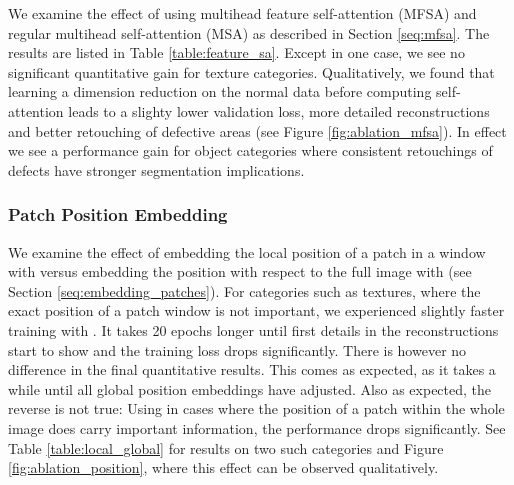 \documentclass[final,5p,times,twocolumn]{elsarticle}
\begin{document}
	We examine the effect of using multihead feature self-attention (MFSA) and regular multihead self-attention (MSA) as described in Section \ref{seq:mfsa}. The results are listed in Table \ref{table:feature_sa}. Except in one case, we see no significant quantitative gain for texture categories. Qualitatively, we found that learning a dimension reduction on the normal data before computing self-attention leads to a slighty lower validation loss, more detailed reconstructions and better retouching of defective areas (see Figure \ref{fig:ablation_mfsa}). In effect we see a performance gain for object categories where consistent retouchings of defects have stronger segmentation implications. 
	
	\begin{table}[h]
		\begin{center}
			\label{table:feature_sa}
		\end{center}
	\end{table}
	
	\subsubsection{Patch Position Embedding}
	\label{ablation:patch_position_embedding}
	
	We examine the effect of embedding the local position of a patch in a window with  versus embedding the position with respect to the full image with  (see Section \ref{seq:embedding_patches}). For categories such as textures, where the exact position of a patch window is not important, we experienced slightly faster training with . It takes 20 epochs longer until first details in the reconstructions start to show and the training loss drops significantly. There is however no difference in the final quantitative results. This comes as expected, as it takes a while until all global position embeddings have adjusted. Also as expected, the reverse is not true: Using  in cases where the position of a patch within the whole image does carry important information, the performance drops significantly. See Table \ref{table:local_global} for results on two such categories and Figure \ref{fig:ablation_position}, where this effect can be observed qualitatively. 
	
\end{document}
